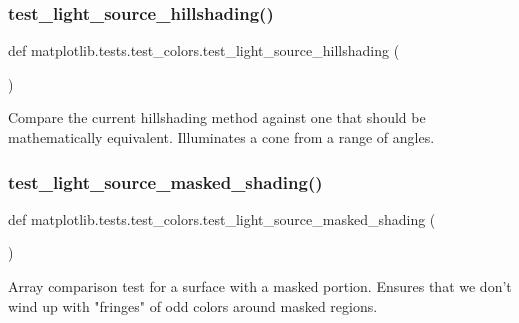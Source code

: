 \subsubsection{\texorpdfstring{test\+\_\+light\+\_\+source\+\_\+hillshading()}{test\_light\_source\_hillshading()}}
{\footnotesize\ttfamily def matplotlib.\+tests.\+test\+\_\+colors.\+test\+\_\+light\+\_\+source\+\_\+hillshading (\begin{DoxyParamCaption}{ }\end{DoxyParamCaption})}

\begin{DoxyVerb}Compare the current hillshading method against one that should be
mathematically equivalent. Illuminates a cone from a range of angles.
\end{DoxyVerb}
 \mbox{\label{namespacematplotlib_1_1tests_1_1test__colors_a2a4f294c756cc19fc93f1f357ddd428e}} 
\subsubsection{\texorpdfstring{test\+\_\+light\+\_\+source\+\_\+masked\+\_\+shading()}{test\_light\_source\_masked\_shading()}}
{\footnotesize\ttfamily def matplotlib.\+tests.\+test\+\_\+colors.\+test\+\_\+light\+\_\+source\+\_\+masked\+\_\+shading (\begin{DoxyParamCaption}{ }\end{DoxyParamCaption})}

\begin{DoxyVerb}Array comparison test for a surface with a masked portion. Ensures that
we don't wind up with "fringes" of odd colors around masked regions.
\end{DoxyVerb}
 \mbox{\label{namespacematplotlib_1_1tests_1_1test__colors_a9301b35eba437e8f2085b8c536da0b53}} 
